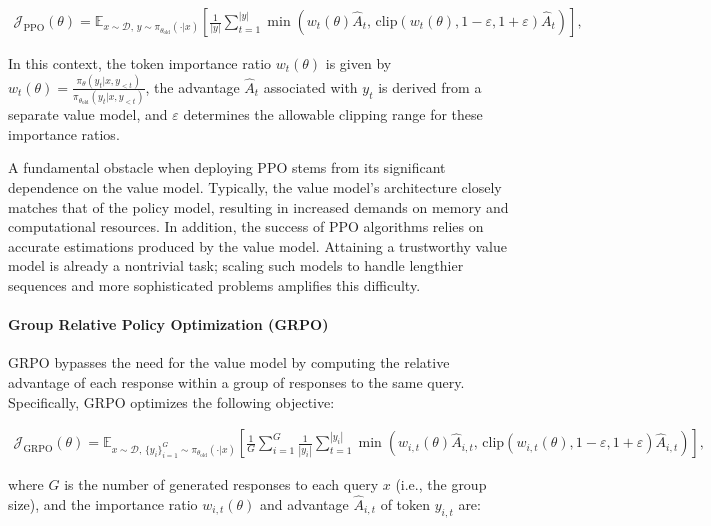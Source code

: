 \begin{align}
\mathcal{J}_\text{PPO}(\theta) = \mathbb{E}_{ x \sim \mathcal{D},\, y \sim \pi_{\theta_\text{old}}( \cdot | x) }
\left[ \frac{1}{|y|} \sum_{t=1}^{|y|} 
\min \left( w_{t}(\theta) \widehat{A}_{t},  \, \mathrm{clip} \left( w_{t}(\theta), 1 - {\varepsilon}, 1 + {\varepsilon}\right) \widehat{A}_{t} \right)
\right],
\end{align}

In this context, the token importance ratio $w_{t}(\theta)$ is given by $w_{t}(\theta) = \frac{ \pi_{\theta} (y_{t} | x, y_{<t}) }{ \pi_{\theta_\text{old}} (y_{t} | x,y_{<t})}$, the advantage $\widehat{A}_{t}$ associated with $y_t$ is derived from a separate value model, and $\varepsilon$ determines the allowable clipping range for these importance ratios.

A fundamental obstacle when deploying PPO stems from its significant dependence on the value model. Typically, the value model's architecture closely matches that of the policy model, resulting in increased demands on memory and computational resources. In addition, the success of PPO algorithms relies on accurate estimations produced by the value model. Attaining a trustworthy value model is already a nontrivial task; scaling such models to handle lengthier sequences and more sophisticated problems amplifies this difficulty.

\paragraph{Group Relative Policy Optimization (GRPO)} GRPO \citep{grpo} bypasses the need for the value model by computing the relative advantage of each response within a group of responses to the same query. Specifically, GRPO optimizes the following objective:

\begin{align}
\label{equ:grpo}
\mathcal{J}_\text{GRPO}(\theta) = \mathbb{E}_{ x \sim \mathcal{D},\, \{y_i\}_{i=1}^G \sim \pi_{\theta_\text{old}}( \cdot | x) }
\left[ \frac{1}{G} \sum_{i=1}^{G} \frac{1}{|y_i|} \sum_{t=1}^{|y_i|} 
\min \left( w_{i,t}(\theta) \widehat{A}_{i,t},  \, \mathrm{clip} \left( w_{i,t}(\theta), 1 - {\varepsilon}, 1 + {\varepsilon}\right) \widehat{A}_{i,t} \right)
\right],
\end{align}

where $G$ is the number of generated responses to each query $x$ (i.e., the group size), and the importance ratio $w_{i,t}(\theta)$ and advantage $\widehat{A}_{i,t}$ of token $y_{i,t}$ are:

